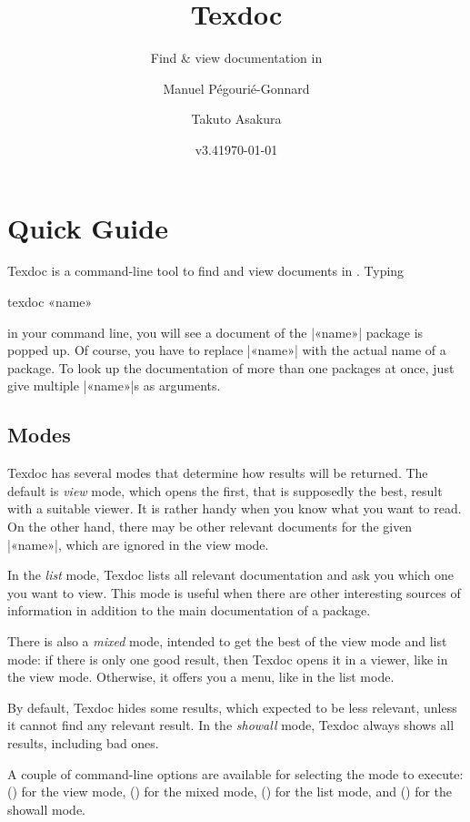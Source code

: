 \documentclass{texdoc-doc}
\title{Texdoc}
\subtitle{Find \& view documentation in \TL}
\author{Manuel Pégourié-Gonnard\and Takuto Asakura}
\date{v3.4\quad \today}
\begin{document}
\VerbatimFootnotes

\maketitle

\section{Quick Guide}

Texdoc is a command-line tool to find and view documents in {\TL}. Typing
%
\begin{htcode}
texdoc «name»
\end{htcode}
%
in your command line, you will see a document of the |«name»| package is popped
up. Of course, you have to replace |«name»| with the actual name of a package.
To look up the documentation of more than one packages at once, just give
multiple |«name»|s as arguments.

\subsection{Modes}
\label{sec:modes}

Texdoc has several modes that determine how results will be returned. The
default is \emph{view} mode, which opens the first, that is supposedly the
best, result with a suitable viewer. It is rather handy when you know what you
want to read. On the other hand, there may be other relevant documents for the
given |«name»|, which are ignored in the view mode.

In the \emph{list} mode, Texdoc lists all relevant documentation and ask you
which one you want to view. This mode is useful when there are other
interesting sources of information in addition to the main documentation of a
package.

There is also a \emph{mixed} mode, intended to get the best of the view mode
and list mode: if there is only one good result, then Texdoc opens it in a
viewer, like in the view mode. Otherwise, it offers you a menu, like in the
list mode.

By default, Texdoc hides some results, which expected to be less relevant,
unless it cannot find any relevant result. In the \emph{showall} mode, Texdoc
always shows all results, including bad ones.

A couple of command-line options are available for selecting the mode to
execute:  () for the view mode,  () for
the mixed mode,  () for the list mode, and 
() for the showall mode.
\end{document}
